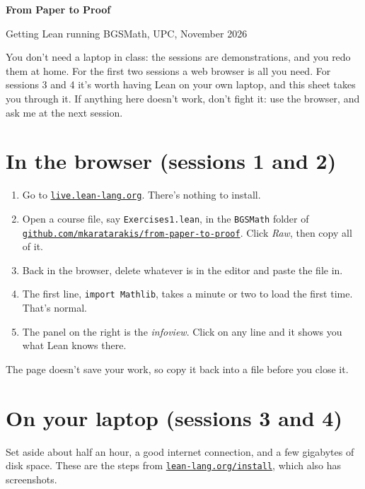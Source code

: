 \documentclass[11pt]{article}
\begin{document}
{\LARGE\bfseries From Paper to Proof\par}
\vspace{0.2em}
{\large Getting Lean running \textperiodcentered{} BGSMath, UPC, November 2026\par}
\vspace{0.6em}

You don't need a laptop in class: the sessions are demonstrations, and you redo them at home.
For the first two sessions a web browser is all you need. For sessions 3 and 4 it's worth having Lean on your own laptop, and this sheet takes you through it. If anything here doesn't work, don't fight it: use the browser, and ask me at the next session.

\section{In the browser (sessions 1 and 2)}

\begin{enumerate}
\item Go to \href{https://live.lean-lang.org}{\texttt{live.lean-lang.org}}. There's nothing to install.
\item Open a course file, say \texttt{Exercises1.lean}, in the \texttt{BGSMath} folder of \href{https://github.com/mkaratarakis/from-paper-to-proof}{\texttt{github.com/mkaratarakis/from-paper-to-proof}}. Click \emph{Raw}, then copy all of it.
\item Back in the browser, delete whatever is in the editor and paste the file in.
\item The first line, \texttt{import Mathlib}, takes a minute or two to load the first time. That's normal.
\item The panel on the right is the \emph{infoview}. Click on any line and it shows you what Lean knows there.
\end{enumerate}
The page doesn't save your work, so copy it back into a file before you close it.

\section{On your laptop (sessions 3 and 4)}

Set aside about half an hour, a good internet connection, and a few gigabytes of disk space.
These are the steps from \href{https://lean-lang.org/install/}{\texttt{lean-lang.org/install}}, which also has screenshots.
\end{document}
